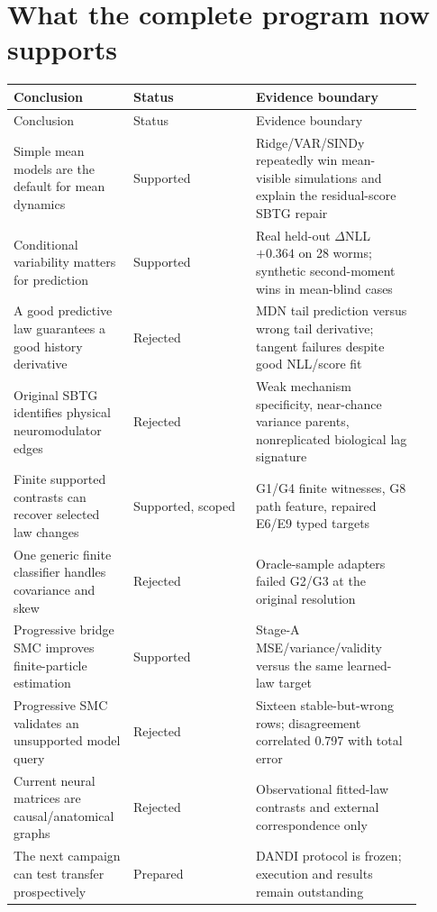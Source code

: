 \documentclass[10pt]{article}
\begin{document}
\section{What the complete program now supports}

\begin{longtable}{L{0.24\linewidth}L{0.28\linewidth}L{0.38\linewidth}}
\toprule
Conclusion & Status & Evidence boundary \\
\midrule
\endfirsthead
\toprule Conclusion & Status & Evidence boundary \\
\midrule\endhead
Simple mean models are the default for mean dynamics & Supported & Ridge/VAR/SINDy repeatedly win mean-visible simulations and explain the residual-score SBTG repair \\
Conditional variability matters for prediction & Supported & Real held-out $\Delta$NLL $+0.364$ on 28 worms; synthetic second-moment wins in mean-blind cases \\
A good predictive law guarantees a good history derivative & Rejected & MDN tail prediction versus wrong tail derivative; tangent failures despite good NLL/score fit \\
Original SBTG identifies physical neuromodulator edges & Rejected & Weak mechanism specificity, near-chance variance parents, nonreplicated biological lag signature \\
Finite supported contrasts can recover selected law changes & Supported, scoped & G1/G4 finite witnesses, G8 path feature, repaired E6/E9 typed targets \\
One generic finite classifier handles covariance and skew & Rejected & Oracle-sample adapters failed G2/G3 at the original resolution \\
Progressive bridge SMC improves finite-particle estimation & Supported & Stage-A MSE/variance/validity versus the same learned-law target \\
Progressive SMC validates an unsupported model query & Rejected & Sixteen stable-but-wrong rows; disagreement correlated 0.797 with total error \\
Current neural matrices are causal/anatomical graphs & Rejected & Observational fitted-law contrasts and external correspondence only \\
The next campaign can test transfer prospectively & Prepared & DANDI protocol is frozen; execution and results remain outstanding \\
\bottomrule
\end{longtable}
\end{document}
